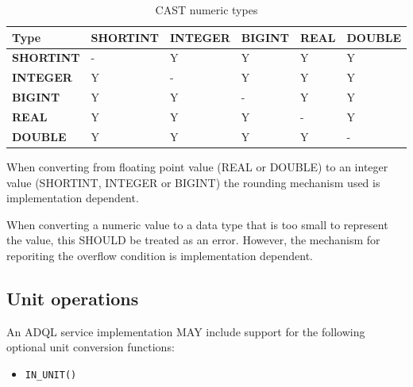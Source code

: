 \documentclass[11pt,a4paper]{ivoa}
\begin{document}
\begin{table}[thm]\footnotesize
    \begin{tabular}{
        |p{}
        |p{}
        |p{}
        |p{}
        |p{}
        |p{}
        |}
       
        \hline
        \textbf{Type} &
        \textbf{SHORTINT} &
        \textbf{INTEGER} &
        \textbf{BIGINT} &
        \textbf{REAL} &
        \textbf{DOUBLE}
        \tabularnewline

        \hline
        \textbf{SHORTINT} &
        - &
        Y &
        Y &
        Y &
        Y
        \tabularnewline

        \hline
        \textbf{INTEGER} &
        Y &
        - &
        Y &
        Y &
        Y
        \tabularnewline

        \hline
        \textbf{BIGINT} &
        Y &
        Y &
        - &
        Y &
        Y
        \tabularnewline

        \hline
        \textbf{REAL} &
        Y &
        Y &
        Y &
        - &
        Y
        \tabularnewline

        \hline
        \textbf{DOUBLE} &
        Y &
        Y &
        Y &
        Y &
        -
        \tabularnewline

        \hline
    \end{tabular}
    \caption{CAST numeric types}
    \label{table:adql.cast.numeric}
\end{table}

When converting from floating point value (REAL or DOUBLE) to an integer
value (SHORTINT, INTEGER or BIGINT) the rounding mechanism used is
implementation dependent.

When converting a numeric value to a data type that is too small to represent
the value, this SHOULD be treated as an error. However, the mechanism for
reporiting the overflow condition is implementation dependent.

\subsection{Unit operations}
\label{sec:unit}

An ADQL service implementation MAY include support for the following optional
unit conversion functions:

\begin{itemize}
    \item \verb:IN_UNIT():
\end{itemize}
\end{document}

